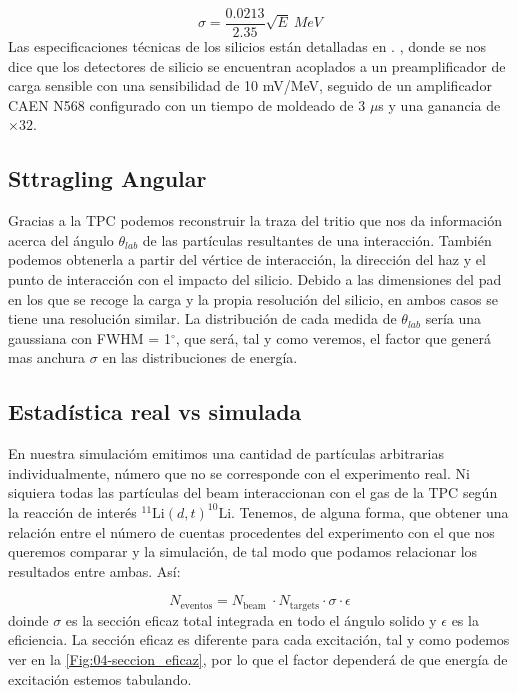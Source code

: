 \begin{equation}
	\sigma = \frac{0.0213}{2.35} \sqrt{E} \ \unit{MeV} \label{Ec:03-resolucion}
\end{equation}
Las especificaciones técnicas de los silicios están detalladas en   \cite{MAUSS2019498}. , donde se nos dice que los detectores de silicio se encuentran acoplados a un preamplificador de carga sensible con una sensibilidad de 10 mV/MeV, seguido de un amplificador CAEN N568 configurado con un tiempo de moldeado de 3 $\mu$s y una ganancia de $\times 32$.

\subsection{Sttragling Angular}

Gracias a la TPC podemos reconstruir la traza del tritio que nos da información acerca del ángulo $\theta_{lab}$ de las partículas resultantes de una interacción. También podemos obtenerla  a partir del vértice de interacción, la dirección del haz y el punto de interacción con el impacto del silicio. Debido a las dimensiones del pad en los que se recoge la carga y la propia resolución del silicio, en ambos casos se tiene una resolución similar. La distribución de cada medida de $\theta_{lab}$ sería una gaussiana con FWHM = 1$^{\circ}$, que será, tal y como veremos, el factor que generá mas anchura $\sigma$ en las distribuciones de energía.

\subsection{Estadística real vs simulada}

En nuestra simulacióm emitimos una cantidad de partículas arbitrarias individualmente, número que no se corresponde con el experimento real. Ni siquiera todas las partículas del beam interaccionan con el gas de la TPC según la reacción de interés $^{11} \text{Li}(d,t)^{10}\text{Li}$. Tenemos, de alguna forma, que obtener una relación entre el número de cuentas procedentes del experimento con el que nos queremos comparar y la simulación, de tal modo que podamos relacionar los resultados entre ambas. Así:

\begin{equation}
	N_{\text{eventos}}  = N_{\text{beam }} \cdot N_{\text{targets}} \cdot \sigma \cdot \epsilon \label{Ec:3.21}
\end{equation}
doinde $\sigma$ es la sección eficaz total integrada en todo el ángulo solido y $\epsilon$ es la eficiencia. La sección eficaz es diferente para cada excitación, tal y como podemos ver en la \cref{Fig:04-seccion_eficaz}, por lo que el factor dependerá de que energía de excitación estemos tabulando.

